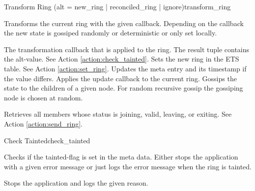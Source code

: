 \begin{actionbox}{Transform Ring (alt = new\_ring | reconciled\_ring | ignore)}{transform_ring}
	\begin{action}
		 Transforms the current ring with the given callback.
		Depending on the callback the new state is gossiped randomly or deterministic or only set locally.
		\begin{action}
			 The transformation callback that is applied to the ring. The result tuple contains the alt-value.
			 See Action \ref{action:check_tainted}.
			 Sets the new ring in the ETS table.
			See Action \ref{action:set_ring}.
			 Updates the meta entry and its timestamp if the value differs.
			 Applies the update callback to the current ring.
			 Gossips the state to the children of a given node.
			 For random recursive gossip the gossiping node is chosen at random.
			\begin{action}
				 Retrieves all members whose status is joining, valid, leaving, or exiting.
				 See Action \ref{action:send_ring}.
			\end{action}
		\end{action}
	\end{action}
\end{actionbox}

\begin{actionbox}{Check Tainted}{check_tainted}
	\begin{action}
		 Checks if the tainted-flag is set in the meta data.
		Either stops the application with a given error message or just logs the error message when the ring is tainted.
		\begin{action}
			 Stops the application and logs the given reason.
		\end{action}
	\end{action}
\end{actionbox}

